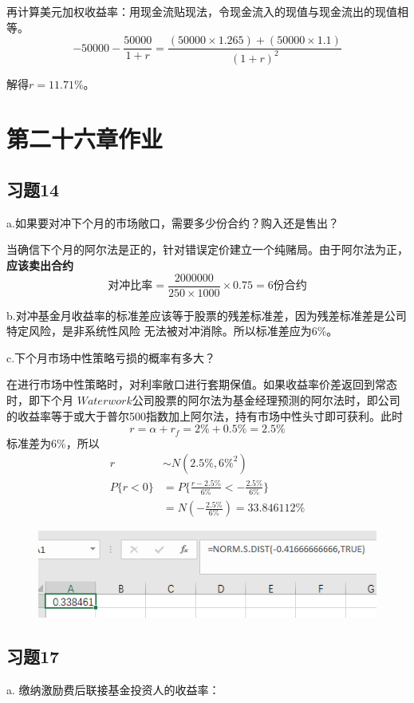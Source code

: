 \documentclass{article}
\begin{document}
再计算美元加权收益率：用现金流贴现法，令现金流入的现值与现金流出的现值相等。
\[-50000-\frac{50000}{1+r}=\frac{(50000\times 1.265)+(50000\times 1.1)}{(1+r)^2}\]

解得$r=11.71\%$。
\clearpage
\section*{\center 第二十六章作业}
\subsection*{习题14}
a.如果要对冲下个月的市场敞口，需要多少份合约？购入还是售出？

当确信下个月的阿尔法是正的，针对错误定价建立一个纯赌局。由于阿尔法为正，\textbf{应该卖出合约}
\[\text{对冲比率}=\frac{2000000}{250 \times 1000}\times 0.75=6\text{份合约}\]

b.对冲基金月收益率的标准差应该等于股票的残差标准差，因为残差标准差是公司特定风险，是非系统性风险
无法被对冲消除。所以标准差应为6\%。

c.下个月市场中性策略亏损的概率有多大？

在进行市场中性策略时，对利率敞口进行套期保值。如果收益率价差返回到常态时，即下个月
$Waterwork$公司股票的阿尔法为基金经理预测的阿尔法时，即公司的收益率等于或大于普尔500指数加上阿尔法，持有市场中性头寸即可获利。此时
\[r=\alpha +r_f=2\%+0.5\%=2.5\%\]
标准差为6\%，所以
\begin{align}
    r&\sim N(2.5\%,6\% ^2)\\
    P\{r<0\}&=P\{\frac{r-2.5\%}{6\%}<-\frac{2.5\%}{6\%}\}\\
    &=N (-\frac{2.5\%}{6\%})=33.846112\%
\end{align}
\begin{figure}[H]
    \begin{center}
        \includegraphics[width=1\textwidth]{1.png}
        \maketitle
    \end{center}
\end{figure}
\clearpage
\subsection*{习题17}
a. 缴纳激励费后联接基金投资人的收益率：
\end{document}
